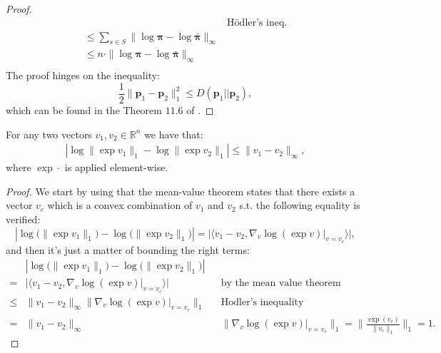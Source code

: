 \begin{claim}
\begin{proof}
\begin{align*}
            && \text{Hödler's ineq.}\\
            & \leq \sum_{s\in S} 
             \|  \log \bm{\pi} - \log \bar{\bm{\pi}} \|_\infty  
            && \\
            & \leq 
            n \cdot
             \|  \log \bm{\pi} - \log \bar{\bm{\pi}} \|_\infty  
            && \\
        \end{align*}
        The proof hinges on the inequality:
        \[ \frac{1}{2} \|\bm{p}_1 - \bm{p}_2 \|_1^2 \leq D(\bm{p}_1||\bm{p}_2), \]
        which can be found in the Theorem $11.6$ of \cite{Cover2006}.
    \end{proof}
\end{claim}

\begin{claim}
    \label{claim:infinity_log_exp}
    For any two vectors $v_1,v_2 \in \mathbb{R}^n$ we have that:
    \begin{align*}
        |\log \| \exp v_1 \|_1 -\log \| \exp v_2 \|_1| \leq \|v_1-v_2\|_\infty,
    \end{align*}
    where $\exp \cdot$ is applied element-wise.
    \begin{proof}
        We start by using that the mean-value theorem states that there exists a vector $v_c$ which is a convex combination of $v_1$ and $v_2$ s.t. the following equality is verified:
        \[
            | \log \bigl( \| \exp v_1 \|_1 \bigr) - \log \bigl( \| \exp v_2 \|_1 \bigr)  | 
            =  
            | \big\langle 
            v_1 - v_2,
            \nabla_v \log (\exp v) |_{v = v_c}
            \big\rangle |,
        \]
        and then it's just a matter of bounding the right terms:
        \begin{align*}
            &| \log \bigl( \| \exp v_1 \|_1 \bigr) - \log \bigl( \| \exp v_2 \|_1 \bigr)  | \\
            =  &
            | \big\langle 
            v_1 - v_2,
            \nabla_v \log (\exp v) |_{v = v_c}
            \big\rangle | && \text{by the mean value theorem}
            \\
            \leq  & 
            \| v_1 - v_2 \|_\infty \| \nabla_v \log (\exp v) |_{v = v_c} \|_1
            && \text{Hodler's inequality} 
            \\
            =  & 
            \| v_1 - v_2 \|_\infty
            &&
            \| \nabla_v \log (\exp v) |_{v = v_c} \|_1 =
            \Bigg\|\frac{\exp(v_c)}{\|v_c\|_1}\Bigg\|_1 = 1.
        \end{align*}
    \end{proof}
\end{claim}

